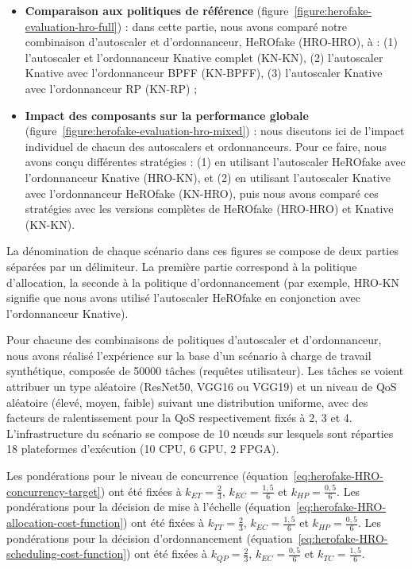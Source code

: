 \begin{itemize}
    \item \textbf{Comparaison aux politiques de référence} (figure~\ref{figure:herofake-evaluation-hro-full}) : dans cette partie, nous avons comparé notre combinaison d'autoscaler et d'ordonnanceur, HeROfake (HRO-HRO), à : (1) l'autoscaler et l'ordonnanceur Knative complet (KN-KN), (2) l'autoscaler Knative avec l'ordonnanceur BPFF (KN-BPFF), (3) l'autoscaler Knative avec l'ordonnanceur RP (KN-RP) ;
    \item \textbf{Impact des composants sur la performance globale} (figure~\ref{figure:herofake-evaluation-hro-mixed}) : nous discutons ici de l'impact individuel de chacun des autoscalers et ordonnanceurs. Pour ce faire, nous avons conçu différentes stratégies : (1) en utilisant l'autoscaler HeROfake avec l'ordonnanceur Knative (HRO-KN), et (2) en utilisant l'autoscaler Knative avec l'ordonnanceur HeROfake (KN-HRO), puis nous avons comparé ces stratégies avec les versions complètes de HeROfake (HRO-HRO) et Knative (KN-KN).
\end{itemize}

La dénomination de chaque scénario dans ces figures se compose de deux parties séparées par un délimiteur. La première partie correspond à la politique d'allocation, la seconde à la politique d'ordonnancement (par exemple, HRO-KN signifie que nous avons utilisé l'autoscaler HeROfake en conjonction avec l'ordonnanceur Knative).

Pour chacune des combinaisons de politiques d'autoscaler et d'ordonnanceur, nous avons réalisé l'expérience sur la base d'un scénario à charge de travail synthétique, composée de 50000 tâches (requêtes utilisateur). Les tâches se voient attribuer un type aléatoire (ResNet50, VGG16 ou VGG19) et un niveau de QoS aléatoire (élevé, moyen, faible) suivant une distribution uniforme, avec des facteurs de ralentissement pour la QoS respectivement fixés à 2, 3 et 4. L'infrastructure du scénario se compose de 10 nœuds sur lesquels sont réparties 18 plateformes d'exécution (10 CPU, 6 GPU, 2 FPGA).

Les pondérations pour le niveau de concurrence (équation~\ref{eq:herofake-HRO-concurrency-target}) ont été fixées à $k_{ET} = \frac{2}{3}$, $k_{EC} = \frac{1,5}{6}$ et $k_{HP} = \frac{0,5}{6}$. Les pondérations pour la décision de mise à l'échelle (équation~\ref{eq:herofake-HRO-allocation-cost-function}) ont été fixées à $k_{TT} = \frac{2}{3}$, $k_{EC} = \frac{1,5}{6}$ et $k_{HP} = \frac{0,5}{6}$. Les pondérations pour la décision d'ordonnancement (équation~\ref{eq:herofake-HRO-scheduling-cost-function}) ont été fixées à $k_{QP} = \frac{2}{3}$, $k_{EC} = \frac{0,5}{6}$ et $k_{TC} = \frac{1,5}{6}$.

